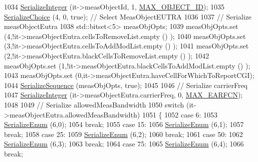 \begin{DoxyCode}
1034           \hyperlink{classns3_1_1Asn1Header_ab1c3bd37730affa7473bc759d625c29a}{SerializeInteger} (it->measObjectId, 1, \hyperlink{lte-rrc-header_8cc_ab2de695aee029784062779621283535d}{MAX\_OBJECT\_ID});
1035           \hyperlink{classns3_1_1Asn1Header_a400ef4a710499da80fc55e23a973d4fa}{SerializeChoice} (4, 0, \textcolor{keyword}{true}); \textcolor{comment}{// Select MeasObjectEUTRA}
1036 
1037           \textcolor{comment}{// Serialize measObjectEutra}
1038           std::bitset<5> measObjOpts;
1039           measObjOpts.set (4,!it->measObjectEutra.cellsToRemoveList.empty () );
1040           measObjOpts.set (3,!it->measObjectEutra.cellsToAddModList.empty () );
1041           measObjOpts.set (2,!it->measObjectEutra.blackCellsToRemoveList.empty () );
1042           measObjOpts.set (1,!it->measObjectEutra.blackCellsToAddModList.empty () );
1043           measObjOpts.set (0,it->measObjectEutra.haveCellForWhichToReportCGI);
1044           \hyperlink{classns3_1_1Asn1Header_aa9744858380443ed95836fed08799aed}{SerializeSequence} (measObjOpts, \textcolor{keyword}{true});
1045 
1046           \textcolor{comment}{// Serialize carrierFreq}
1047           \hyperlink{classns3_1_1Asn1Header_ab1c3bd37730affa7473bc759d625c29a}{SerializeInteger} (it->measObjectEutra.carrierFreq, 0, 
      \hyperlink{lte-rrc-header_8cc_a7851a91be0aab6446639f0ff8ee48b45}{MAX\_EARFCN});
1048 
1049           \textcolor{comment}{// Serialize  allowedMeasBandwidth}
1050           \textcolor{keywordflow}{switch} (it->measObjectEutra.allowedMeasBandwidth)
1051             \{
1052             \textcolor{keywordflow}{case} 6:
1053               \hyperlink{classns3_1_1Asn1Header_ac8e56956823ab8e4470c09e162e7bf24}{SerializeEnum} (6,0);
1054               \textcolor{keywordflow}{break};
1055             \textcolor{keywordflow}{case} 15:
1056               \hyperlink{classns3_1_1Asn1Header_ac8e56956823ab8e4470c09e162e7bf24}{SerializeEnum} (6,1);
1057               \textcolor{keywordflow}{break};
1058             \textcolor{keywordflow}{case} 25:
1059               \hyperlink{classns3_1_1Asn1Header_ac8e56956823ab8e4470c09e162e7bf24}{SerializeEnum} (6,2);
1060               \textcolor{keywordflow}{break};
1061             \textcolor{keywordflow}{case} 50:
1062               \hyperlink{classns3_1_1Asn1Header_ac8e56956823ab8e4470c09e162e7bf24}{SerializeEnum} (6,3);
1063               \textcolor{keywordflow}{break};
1064             \textcolor{keywordflow}{case} 75:
1065               \hyperlink{classns3_1_1Asn1Header_ac8e56956823ab8e4470c09e162e7bf24}{SerializeEnum} (6,4);
1066               \textcolor{keywordflow}{break};

\end{DoxyCode}
